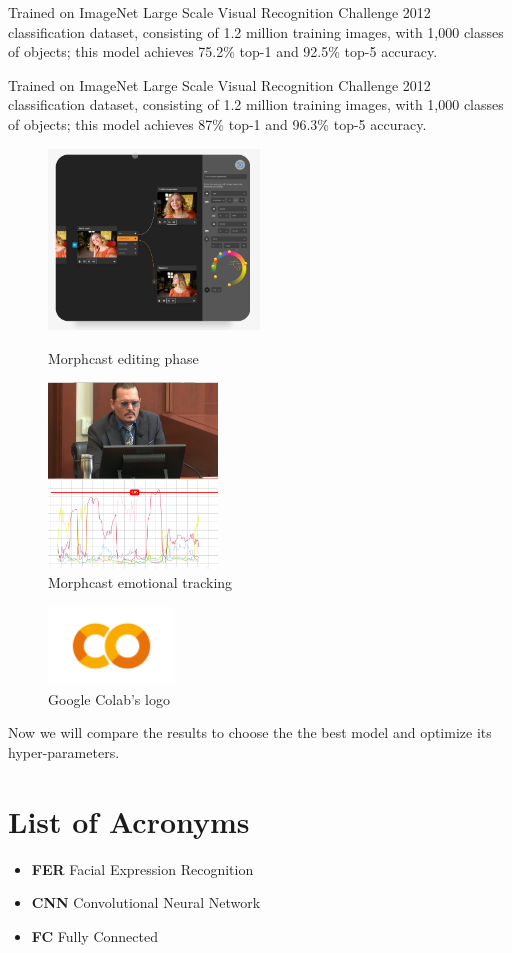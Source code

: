 Trained on ImageNet Large Scale Visual Recognition Challenge 2012 classification dataset, consisting of 1.2 million training images, with 1,000 classes of objects; this model achieves 75.2\% top-1 and 92.5\% top-5 accuracy.

Trained on ImageNet Large Scale Visual Recognition Challenge 2012 classification dataset, consisting of 1.2 million training images, with 1,000 classes of objects; this model achieves 87\% top-1 and 96.3\% top-5 accuracy.

\begin{figure}[H]
    \centering
    \includegraphics[width=0.5\textwidth]{figures/State of art/morphcast.PNG}
    \caption{Morphcast editing phase}
    \label{fig:morphcast}
    \cite{morphcast}
\end{figure}
\begin{figure}[H]
    \centering
    \includegraphics[width=0.4\textwidth]{figures/State of art/morphcast_test.png}
    \caption{Morphcast emotional tracking}
    \label{fig:morphcast_test}
\end{figure}

\begin{figure}[H]
    \centering
    \includegraphics[width=0.3\textwidth]{figures/google colab logo.png}
    \caption{Google Colab's logo}
    \label{googleColab}
\end{figure}
Now we will compare the results to choose the the best model and optimize its hyper-parameters.

\chapter*{\textbf{List of Acronyms}}
\begin{itemize}
\item \textbf{FER} Facial Expression Recognition
\item \textbf{CNN} Convolutional Neural Network
\item \textbf{FC} Fully Connected
\end{itemize}